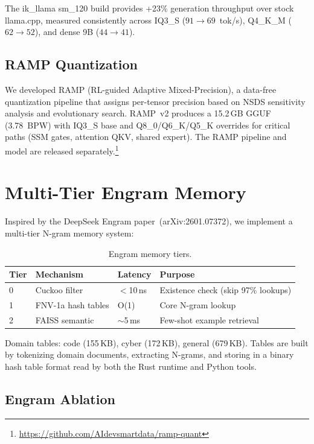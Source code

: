 \documentclass[10pt,a4paper]{article}
\begin{document}
The ik\_llama sm\_120 build provides +23\% generation throughput over stock llama.cpp, measured consistently across IQ3\_S ($91 \to 69$~tok/s), Q4\_K\_M ($62 \to 52$), and dense 9B ($44 \to 41$).

\subsection{RAMP Quantization}

We developed RAMP (RL-guided Adaptive Mixed-Precision), a data-free quantization pipeline that assigns per-tensor precision based on NSDS sensitivity analysis and evolutionary search. RAMP~v2 produces a 15.2\,GB GGUF (3.78~BPW) with IQ3\_S base and Q8\_0/Q6\_K/Q5\_K overrides for critical paths (SSM gates, attention QKV, shared expert). The RAMP pipeline and model are released separately.\footnote{\url{https://github.com/AIdevsmartdata/ramp-quant}}

\section{Multi-Tier Engram Memory}

Inspired by the DeepSeek Engram paper~(arXiv:2601.07372), we implement a multi-tier N-gram memory system:

\begin{table}[h]
\centering
\caption{Engram memory tiers.}
\begin{tabular}{llll}
\toprule
\textbf{Tier} & \textbf{Mechanism} & \textbf{Latency} & \textbf{Purpose} \\
\midrule
0 & Cuckoo filter & $<$10\,ns & Existence check (skip 97\% lookups) \\
1 & FNV-1a hash tables & O(1) & Core N-gram lookup \\
2 & FAISS semantic & $\sim$5\,ms & Few-shot example retrieval \\
\bottomrule
\end{tabular}
\end{table}

Domain tables: code (155\,KB), cyber (172\,KB), general (679\,KB). Tables are built by tokenizing domain documents, extracting N-grams, and storing in a binary hash table format read by both the Rust runtime and Python tools.

\subsection{Engram Ablation}
\end{document}
